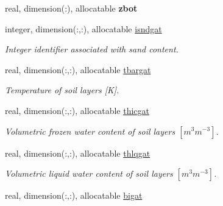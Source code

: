 \begin{DoxyCompactItemize}
\item 
\hypertarget{structclass__statevars_1_1class__gather_aa35cb9b946515aa5fc495be3d613db1f}{}real, dimension(\+:), allocatable {\bfseries zbot}\label{structclass__statevars_1_1class__gather_aa35cb9b946515aa5fc495be3d613db1f}

\item 
\hypertarget{structclass__statevars_1_1class__gather_a46b4c1baaea6fda11c63c0f9a5b3b4ec}{}integer, dimension(\+:,\+:), allocatable \hyperlink{structclass__statevars_1_1class__gather_a46b4c1baaea6fda11c63c0f9a5b3b4ec}{isndgat}\label{structclass__statevars_1_1class__gather_a46b4c1baaea6fda11c63c0f9a5b3b4ec}

\begin{DoxyCompactList}\small\item\em Integer identifier associated with sand content. \end{DoxyCompactList}\item 
\hypertarget{structclass__statevars_1_1class__gather_a136903605ed072e3b7ba46d74f1f3fec}{}real, dimension(\+:,\+:), allocatable \hyperlink{structclass__statevars_1_1class__gather_a136903605ed072e3b7ba46d74f1f3fec}{tbargat}\label{structclass__statevars_1_1class__gather_a136903605ed072e3b7ba46d74f1f3fec}

\begin{DoxyCompactList}\small\item\em Temperature of soil layers \mbox{[}K\mbox{]}. \end{DoxyCompactList}\item 
\hypertarget{structclass__statevars_1_1class__gather_af7724f6e410feb91601310bb18e9d305}{}real, dimension(\+:,\+:), allocatable \hyperlink{structclass__statevars_1_1class__gather_af7724f6e410feb91601310bb18e9d305}{thicgat}\label{structclass__statevars_1_1class__gather_af7724f6e410feb91601310bb18e9d305}

\begin{DoxyCompactList}\small\item\em Volumetric frozen water content of soil layers $[m^3 m^{-3} ]$. \end{DoxyCompactList}\item 
\hypertarget{structclass__statevars_1_1class__gather_a8c1acbc2ea433bf418d9513b4113504c}{}real, dimension(\+:,\+:), allocatable \hyperlink{structclass__statevars_1_1class__gather_a8c1acbc2ea433bf418d9513b4113504c}{thlqgat}\label{structclass__statevars_1_1class__gather_a8c1acbc2ea433bf418d9513b4113504c}

\begin{DoxyCompactList}\small\item\em Volumetric liquid water content of soil layers $[m^3 m^{-3} ]$. \end{DoxyCompactList}\item 
\hypertarget{structclass__statevars_1_1class__gather_aec72f9a82bc6d8223f15c8dbfa83f3e8}{}real, dimension(\+:,\+:), allocatable \hyperlink{structclass__statevars_1_1class__gather_aec72f9a82bc6d8223f15c8dbfa83f3e8}{bigat}\label{structclass__statevars_1_1class__gather_aec72f9a82bc6d8223f15c8dbfa83f3e8}


\end{DoxyCompactItemize}
